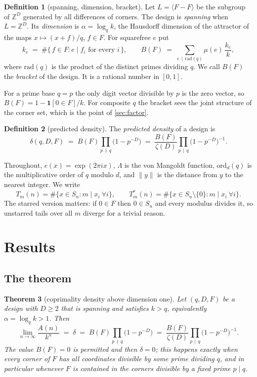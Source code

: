\documentclass[11pt]{amsart}
\newtheorem{theorem}{Theorem}[section]
\theoremstyle{definition}
\newtheorem{definition}[theorem]{Definition}
\theoremstyle{remark}
\begin{document}
\begin{definition}[spanning, dimension, bracket]
\label{def:span}
Let $L = \langle F - F\rangle$ be the subgroup of $\mathbb{Z}^D$ generated by all differences of corners. The design is \emph{spanning} when $L = \mathbb{Z}^D$. Its \emph{dimension} is $\alpha = \log_q k$, the Hausdorff dimension of the attractor of the maps $x \mapsto (x+f)/q$, $f \in F$. For squarefree $e$ put
\[
  k_e \;=\; \#\{\, f \in F : e \mid f_i \text{ for every } i \,\},
  \qquad
  B(F) \;=\; \sum_{e \,\mid\, \mathrm{rad}(q)} \mu(e)\,\frac{k_e}{k},
\]
where $\mathrm{rad}(q)$ is the product of the distinct primes dividing $q$. We call $B(F)$ the \emph{bracket} of the design. It is a rational number in $[0,1]$.
\end{definition}

For a prime base $q=p$ the only digit vector divisible by $p$ is the zero vector, so $B(F) = 1 - \mathbf{1}[0 \in F]/k$. For composite $q$ the bracket sees the joint structure of the corner set, which is the point of \cref{sec:factor}.

\begin{definition}[predicted density]
\label{def:delta}
The \emph{predicted density} of a design is
\[
  \delta(q,D,F) \;=\; B(F) \prod_{p \,\nmid\, q}\bigl(1-p^{-D}\bigr)
  \;=\; \frac{B(F)}{\zeta(D)} \prod_{p \,\mid\, q}\bigl(1-p^{-D}\bigr)^{-1}.
\]
\end{definition}

Throughout, $e(x) = \exp(2\pi i x)$, $\Lambda$ is the von Mangoldt function, $\mathrm{ord}_d(q)$ is the multiplicative order of $q$ modulo $d$, and $\|y\|$ is the distance from $y$ to the nearest integer. We write
\[
  T_m(n) = \#\{x \in S_n : m \mid x_i \ \forall i\},
  \qquad
  T^{*}_m(n) = \#\{x \in S_n \setminus \{0\} : m \mid x_i \ \forall i\}.
\]
The starred version matters: if $0 \in F$ then $0 \in S_n$ and every modulus divides it, so unstarred tails over all $m$ diverge for a trivial reason.

\section{Results}
\label{sec:results}

\subsection{The theorem}

\begin{theorem}[coprimality density above dimension one]
\label{thm:main}
Let $(q,D,F)$ be a design with $D \ge 2$ that is spanning and satisfies $k > q$, equivalently $\alpha = \log_q k > 1$. Then
\[
  \lim_{n \to \infty} \frac{A(n)}{k^{n}}
  \;=\; \delta \;=\; B(F)\prod_{p \,\nmid\, q}\bigl(1-p^{-D}\bigr)
  \;=\; \frac{B(F)}{\zeta(D)}\prod_{p \,\mid\, q}\bigl(1-p^{-D}\bigr)^{-1}.
\]
The value $B(F)=0$ is permitted and then $\delta = 0$; this happens exactly when every corner of $F$ has all coordinates divisible by some prime dividing $q$, and in particular whenever $F$ is contained in the corners divisible by a fixed prime $p \mid q$.
\end{theorem}
\end{document}
